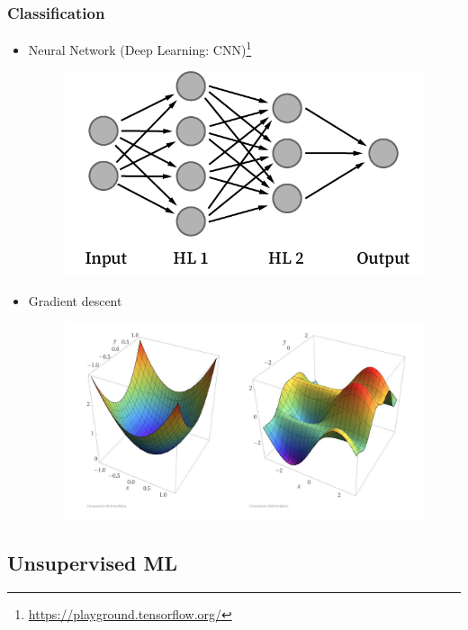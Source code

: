 \begin{frame}\frametitle{Classification}
   \begin{itemize}
      \item Neural Network (Deep Learning: CNN)\footnote{\href{https://playground.tensorflow.org/}{https://playground.tensorflow.org/}}
      \begin{figure}[H]
         \includegraphics[scale=.25]{../images/illustrations/model_neural_network.png}
      \end{figure}
      
      \item Gradient descent
      \begin{figure}[H]
         \includegraphics[scale=.15]{../images/illustrations/model_optimization_gradient_descent.jpeg}
      \end{figure}
   \end{itemize}
\end{frame}


\subsection{Unsupervised ML}

